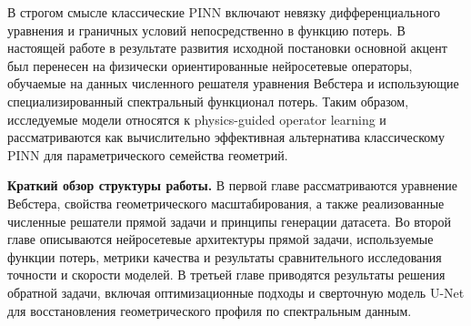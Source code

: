 В строгом смысле классические PINN включают невязку дифференциального уравнения и граничных условий непосредственно в функцию потерь. В настоящей работе в результате развития исходной постановки основной акцент был перенесен на физически ориентированные нейросетевые операторы, обучаемые на данных численного решателя уравнения Вебстера и использующие специализированный спектральный функционал потерь. Таким образом, исследуемые модели относятся к physics-guided operator learning и рассматриваются как вычислительно эффективная альтернатива классическому PINN для параметрического семейства геометрий.

\textbf{Краткий обзор структуры работы.} В первой главе рассматриваются уравнение Вебстера, свойства геометрического масштабирования, а также реализованные численные решатели прямой задачи и принципы генерации датасета. Во второй главе описываются нейросетевые архитектуры прямой задачи, используемые функции потерь, метрики качества и результаты сравнительного исследования точности и скорости моделей. В третьей главе приводятся результаты решения обратной задачи, включая оптимизационные подходы и сверточную модель U-Net для восстановления геометрического профиля по спектральным данным.

